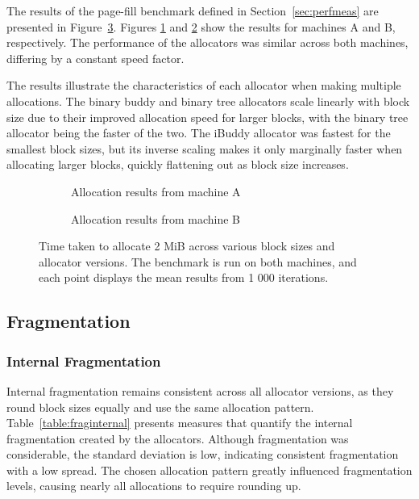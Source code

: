\FloatBarrier

The results of the page-fill benchmark defined in Section~\ref{sec:perfmeas} are presented in Figure~\ref{fig:allocpage}. Figures \ref{fig:allocpageA} and \ref{fig:allocpageB} show the results for machines A and B, respectively. The performance of the allocators was similar across both machines, differing by a constant speed factor.

The results illustrate the characteristics of each allocator when making multiple allocations. The binary buddy and binary tree allocators scale linearly with block size due to their improved allocation speed for larger blocks, with the binary tree allocator being the faster of the two.
The iBuddy allocator was fastest for the smallest block sizes, but its inverse scaling makes it only marginally faster when allocating larger blocks, quickly flattening out as block size increases.

\begin{figure}[h]
  \centering
  \begin{subfigure}{0.496\textwidth}
    \centering
    \captionsetup{justification=centering}
    
    \caption{Allocation results from machine A}
    \label{fig:allocpageA}
  \end{subfigure}
  \begin{subfigure}{0.496\textwidth}
    \centering
    \captionsetup{justification=centering}
    
    \caption{Allocation results from machine B}
    \label{fig:allocpageB}
  \end{subfigure}
  \caption{Time taken to allocate 2 MiB across various block sizes and allocator versions. The benchmark is run on both machines, and each point displays the mean results from 1 000 iterations.}
  \label{fig:allocpage}
\end{figure}

\FloatBarrier
\subsection{Fragmentation}
\subsubsection{Internal Fragmentation}
Internal fragmentation remains consistent across all allocator versions, as they round block sizes equally and use the same allocation pattern. Table~\ref{table:fraginternal} presents measures that quantify the internal fragmentation created by the allocators. Although fragmentation was considerable, the standard deviation is low, indicating consistent fragmentation with a low spread. The chosen allocation pattern greatly influenced fragmentation levels, causing nearly all allocations to require rounding up.

